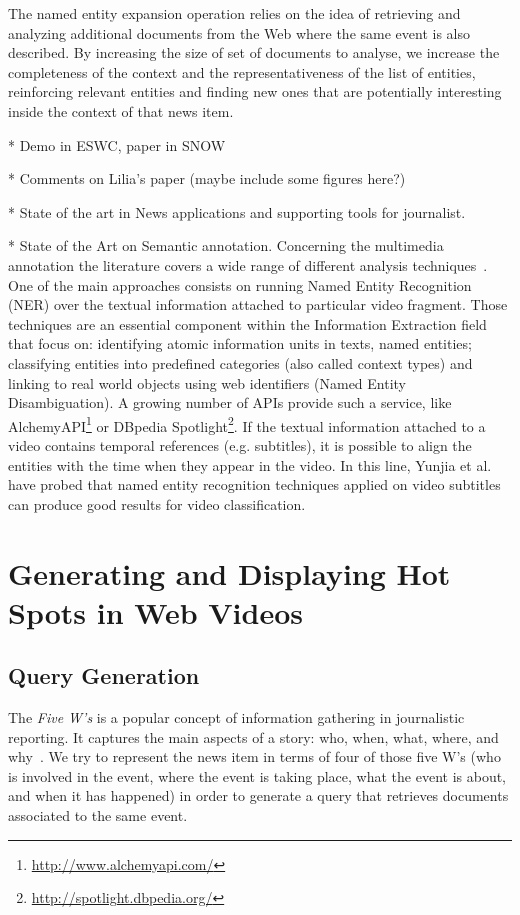 \documentclass{llncs}
\begin{document}
The named entity expansion operation relies on the idea of retrieving and analyzing additional documents from the Web where the same event is also described. By increasing the size of set of documents to analyse, we increase the completeness of the context and the representativeness of the list of entities, reinforcing relevant entities and finding new ones that are potentially interesting inside the context of that news item.

* Demo in ESWC, paper in SNOW

* Comments on Lilia's paper (maybe include some figures here?)

* State of the art in News applications and supporting tools for journalist.

* State of the Art on Semantic annotation.
Concerning the multimedia annotation the literature covers a wide range of different analysis techniques~\cite{ballan2011event}. One of the main approaches consists on running Named Entity Recognition (NER) over the textual information attached to particular video fragment. Those techniques are an essential component within the Information Extraction field that focus on: identifying atomic information units in texts, named entities; classifying entities into predefined categories (also called context types) and linking to real world objects using web identifiers (Named Entity Disambiguation). A growing number of APIs provide such a service, like AlchemyAPI\footnote{\fontsize{8pt}{1em}\selectfont \url{http://www.alchemyapi.com/}} or DBpedia Spotlight\footnote{\fontsize{8pt}{1em}\selectfont \url{http://spotlight.dbpedia.org/}}. If the textual information attached to a video contains temporal references (e.g. subtitles), it is possible to align the entities with the time when they appear in the video. In this line, Yunjia et al.~\cite{yunjia2013} have probed that named entity recognition techniques applied on video subtitles can produce good results for video classification. 

\section{Generating and Displaying Hot Spots in Web Videos}
\label{sec:ConceptExpansion}

\subsection{Query Generation}
The \emph{Five W's} is a popular concept of information gathering in journalistic reporting. It captures the main aspects of a story: who, when, what, where, and why~\cite{LiJia2007}. We try to represent the news item in terms of four of those five W's (who is involved in the event, where the event is taking place, what the event is about, and when it has happened) in order to generate a query that retrieves documents associated to the same event.
\end{document}
